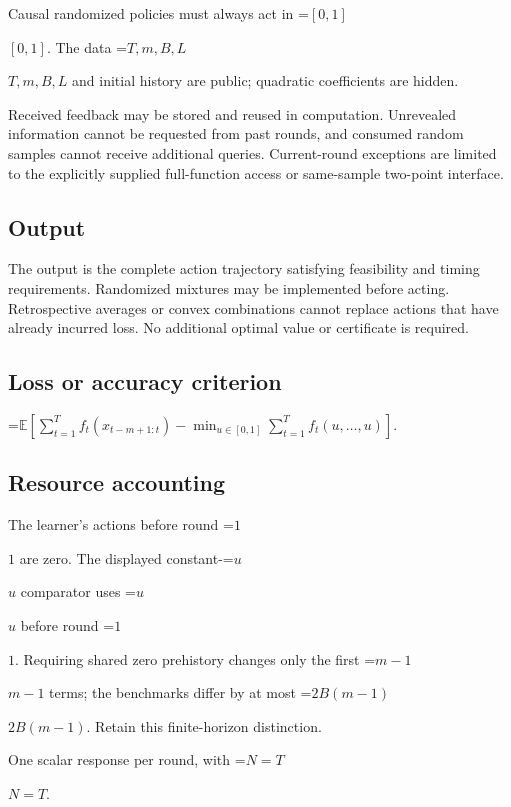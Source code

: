 \documentclass[10pt,a4paper]{article}
\newcommand{\AtlasMath}[1]{\par\begingroup\centering\setbox0=\hbox{$\displaystyle #1$}\ifdim\wd0>1.4\linewidth\typeout{ATLAS WIDE FORMULA: \the\wd0}\fi\ifdim\wd0>\linewidth\resizebox{\linewidth}{!}{\box0}\else\box0\fi\par\endgroup}
\newcommand{\AtlasInlineMath}[1]{\begingroup\setbox0=\hbox{$#1$}\ifdim\wd0>.4\linewidth\endgroup\AtlasMath{#1}\else\endgroup$#1$\fi}
\begin{document}
Causal randomized policies must always act in \AtlasInlineMath{[0,1]}. The data \AtlasInlineMath{T,m,B,L} and initial history are public; quadratic coefficients are hidden.



Received feedback may be stored and reused in computation. Unrevealed information cannot be requested from past rounds, and consumed random samples cannot receive additional queries. Current-round exceptions are limited to the explicitly supplied full-function access or same-sample two-point interface.



\subsection{Output}


The output is the complete action trajectory satisfying feasibility and timing requirements. Randomized mixtures may be implemented before acting. Retrospective averages or convex combinations cannot replace actions that have already incurred loss. No additional optimal value or certificate is required.



\subsection{Loss or accuracy criterion}



\AtlasMath{\mathbb{E}\!\left[\sum_{t=1}^{T}f_t(x_{t-m+1:t})-\min_{u\in[0,1]}\sum_{t=1}^{T}f_t(u,\ldots,u)\right].}




\subsection{Resource accounting}


The learner's actions before round \AtlasInlineMath{1} are zero. The displayed constant-\AtlasInlineMath{u} comparator uses \AtlasInlineMath{u} before round \AtlasInlineMath{1}. Requiring shared zero prehistory changes only the first \AtlasInlineMath{m-1} terms; the benchmarks differ by at most \AtlasInlineMath{2B(m-1)}. Retain this finite-horizon distinction.



One scalar response per round, with \AtlasInlineMath{N=T}.
\end{document}

